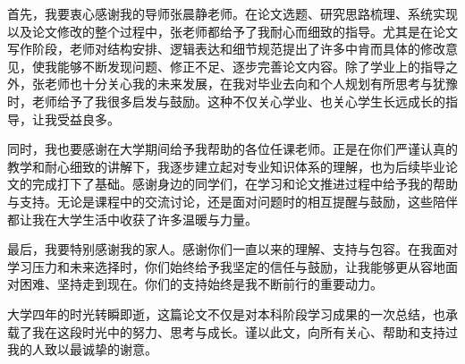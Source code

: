 \documentclass[UTF8,a4paper,zihao=-4]{ctexart}
\begin{document}
首先，我要衷心感谢我的导师张晨静老师。在论文选题、研究思路梳理、系统实现以及论文修改的整个过程中，张老师都给予了我耐心而细致的指导。尤其是在论文写作阶段，老师对结构安排、逻辑表达和细节规范提出了许多中肯而具体的修改意见，使我能够不断发现问题、修正不足、逐步完善论文内容。除了学业上的指导之外，张老师也十分关心我的未来发展，在我对毕业去向和个人规划有所思考与犹豫时，老师给予了我很多启发与鼓励。这种不仅关心学业、也关心学生长远成长的指导，让我受益良多。

同时，我也要感谢在大学期间给予我帮助的各位任课老师。正是在你们严谨认真的教学和耐心细致的讲解下，我逐步建立起对专业知识体系的理解，也为后续毕业论文的完成打下了基础。感谢身边的同学们，在学习和论文推进过程中给予我的帮助与支持。无论是课程中的交流讨论，还是面对问题时的相互提醒与鼓励，这些陪伴都让我在大学生活中收获了许多温暖与力量。

最后，我要特别感谢我的家人。感谢你们一直以来的理解、支持与包容。在我面对学习压力和未来选择时，你们始终给予我坚定的信任与鼓励，让我能够更从容地面对困难、坚持走到现在。你们的支持始终是我不断前行的重要动力。

大学四年的时光转瞬即逝，这篇论文不仅是对本科阶段学习成果的一次总结，也承载了我在这段时光中的努力、思考与成长。谨以此文，向所有关心、帮助和支持过我的人致以最诚挚的谢意。
\clearpage
{}

\end{document}
